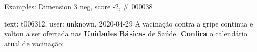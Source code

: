 \begin{frame}{Examples: Dimension 3 neg, score -2, \# 000038}
\footnotesize
\begin{alertblock}{text: t006312, user: unknown, 2020-04-29}
A vacinação contra a gripe continua e voltou a ser ofertada nas 
\textbf{Unidades} \textbf{Básicas} de Saúde. \textbf{Confira} o calendário 
atual de vacinação: 
\end{alertblock}
\end{frame}
